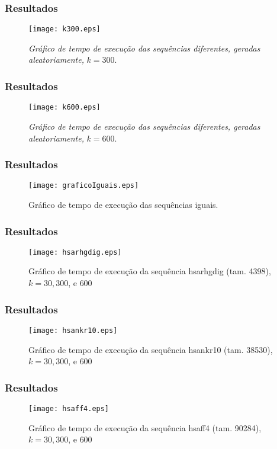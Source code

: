 \documentclass[10pt, compress]{beamer}
\begin{document}
\begin{frame}[fragile]
	\frametitle{Resultados}
	\begin{figure}[!hbt]
		\centering
		\texttt{[image: k300.eps]}
		\caption{\textit{Gráfico de tempo de execução das sequências diferentes, geradas aleatoriamente, }$k = 300.$}
	\end{figure}
\end{frame}

\begin{frame}[fragile]
	\frametitle{Resultados}
	\begin{figure}[!hbt]
		\centering
		\texttt{[image: k600.eps]}
		\caption{\textit{Gráfico de tempo de execução das sequências diferentes, geradas aleatoriamente, }$k = 600.$}
	\end{figure}
\end{frame}

\begin{frame}[fragile]
	\frametitle{Resultados}
	\begin{figure}[!hbt]
		\centering
		\texttt{[image: graficoIguais.eps]}
		\caption{Gráfico de tempo de execução das sequências iguais.}
	\end{figure}
\end{frame}

\begin{frame}[fragile]
	\frametitle{Resultados}
    \begin{figure}[!hbt]
    \centering
        \texttt{[image: hsarhgdig.eps]}
        \caption{Gráfico de tempo de execução da sequência hsarhgdig (tam. 4398), $k = 30, 300$, e $600$}
    \end{figure}
\end{frame}

\begin{frame}[fragile]
	\frametitle{Resultados}
    \begin{figure}[!hbt]
    \centering
        \texttt{[image: hsankr10.eps]}
        \caption{Gráfico de tempo de execução da sequência hsankr10 (tam. 38530), $k = 30, 300$, e $600$}
    \end{figure}
\end{frame}

\begin{frame}[fragile]
	\frametitle{Resultados}
    \begin{figure}[!hbt]
    \centering
        \texttt{[image: hsaff4.eps]}
    \caption{Gráfico de tempo de execução da sequência hsaff4 (tam. 90284), $k = 30, 300$, e $600$}
    \end{figure}
\end{frame}
\end{document}
